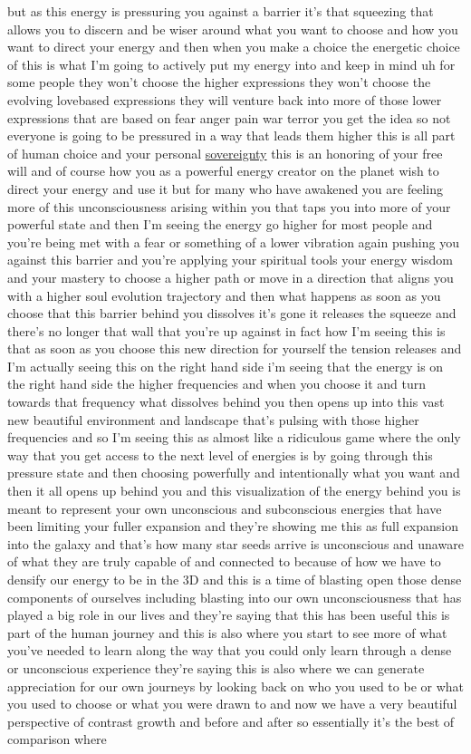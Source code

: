 \documentclass{article}
\begin{document}
but as this energy is pressuring you against a barrier it's that squeezing that allows you to discern and be wiser around what you want to choose and how you want to direct your energy and then when you make a choice the energetic choice of this is what I'm going to actively put my energy into and keep in mind uh for some people they won't choose the higher expressions they won't choose the evolving lovebased expressions they will venture back into more of those lower expressions that are based on fear anger pain war terror you get the idea so not everyone is going to be pressured in a way that leads them higher this is all part of human choice and your personal \hyperlink{gloss:sovereignty}{sovereignty} this is an honoring of your free will and of course how you as a powerful energy creator on the planet wish to direct your energy and use it but for many who have awakened you are feeling more of this unconsciousness arising within you that taps you into more of your powerful state and then I'm seeing the energy go higher for most people and you're being met with a fear or something of a lower vibration again pushing you against this barrier and you're applying your spiritual tools your energy wisdom and your mastery to choose a higher path or move in a direction that aligns you with a higher soul evolution trajectory and then what happens as soon as you choose that this barrier behind you dissolves it's gone it releases the squeeze and there's no longer that wall that you're up against in fact how I'm seeing this is that as soon as you choose this new direction for yourself the tension releases and I'm actually seeing this on the right hand side i'm seeing that the energy is on the right hand side the higher frequencies and when you choose it and turn towards that frequency what dissolves behind you then opens up into this vast new beautiful environment and landscape that's pulsing with those higher frequencies and so I'm seeing this as almost like a ridiculous game where the only way that you get access to the next level of energies is by going through this pressure state and then choosing powerfully and intentionally what you want and then it all opens up behind you and this visualization of the energy behind you is meant to represent your own unconscious and subconscious energies that have been limiting your fuller expansion and they're showing me this as full expansion into the galaxy and that's how many star seeds arrive is unconscious and unaware of what they are truly capable of and connected to because of how we have to densify our energy to be in the 3D and this is a time of blasting open those dense components of ourselves including blasting into our own unconsciousness that has played a big role in our lives and they're saying that this has been useful this is part of the human journey and this is also where you start to see more of what you've needed to learn along the way that you could only learn through a dense or unconscious experience they're saying this is also where we can generate appreciation for our own journeys by looking back on who you used to be or what you used to choose or what you were drawn to and now we have a very beautiful perspective of contrast growth and before and after so essentially it's the best of comparison where 
\end{document}

